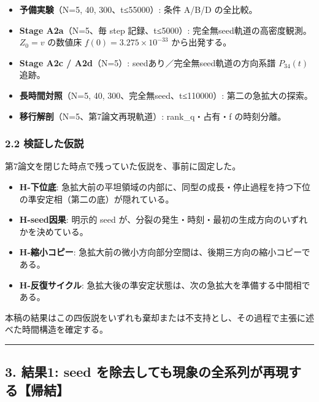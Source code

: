 \documentclass[
  a4paper,
]{ltjsarticle}
\providecommand{\tightlist}{%
  \setlength{\itemsep}{0pt}\setlength{\parskip}{0pt}}
\begin{document}
\begin{itemize}
\tightlist
\item
  \textbf{予備実験}（N=5, 40, 300、t≤55000）: 条件 A/B/D の全比較。
\item
  \textbf{Stage A2a}（N=5、毎 step 記録、t≤5000）:
  完全無seed軌道の高密度観測。\(Z_0=v\) の数値床
  \(f(0)=3.275\times10^{-33}\) から出発する。
\item
  \textbf{Stage A2c / A2d}（N=5）: seedあり／完全無seed軌道の方向系譜
  \(P_{34}(t)\) 追跡。
\item
  \textbf{長時間対照}（N=5, 40, 300、完全無seed、t≤110000）:
  第二の急拡大の探索。
\item
  \textbf{移行解剖}（N=5、第7論文再現軌道）: rank\_q・占有・f
  の時刻分離。
\end{itemize}

\subsubsection{2.2
検証した仮説}\label{ux691cux8a3cux3057ux305fux4eeeux8aac}

第7論文を閉じた時点で残っていた仮説を、事前に固定した。

\begin{itemize}
\tightlist
\item
  \textbf{H-下位底}:
  急拡大前の平坦領域の内部に、同型の成長・停止過程を持つ下位の準安定相（第二の底）が隠れている。
\item
  \textbf{H-seed因果}: 明示的 seed
  が、分裂の発生・時刻・最初の生成方向のいずれかを決めている。
\item
  \textbf{H-縮小コピー}:
  急拡大前の微小方向部分空間は、後期三方向の縮小コピーである。
\item
  \textbf{H-反復サイクル}:
  急拡大後の準安定状態は、次の急拡大を準備する中間相である。
\end{itemize}

本稿の結果はこの四仮説をいずれも棄却または不支持とし、その過程で主張に述べた時間構造を確定する。

\begin{center}\rule{0.5\linewidth}{0.5pt}\end{center}

\subsection{3. 結果1: seed
を除去しても現象の全系列が再現する【帰結】}\label{ux7d50ux679c1-seed-ux3092ux9664ux53bbux3057ux3066ux3082ux73feux8c61ux306eux5168ux7cfbux5217ux304cux518dux73feux3059ux308bux5e30ux7d50}
\end{document}
